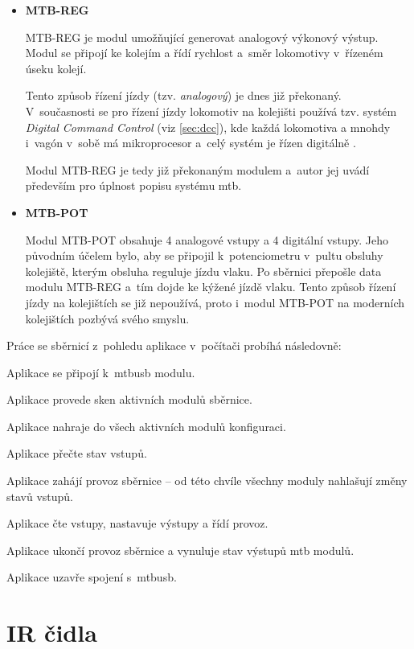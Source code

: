 \begin{itemize}
\item \textbf{MTB-REG}

	MTB-REG je modul umožňující generovat analogový výkonový výstup. Modul se
	připojí ke kolejím a řídí rychlost a~směr lokomotivy v~řízeném úseku kolejí.

	Tento způsob řízení jízdy (tzv. \textit{analogový}) je dnes již překonaný.
	V~současnosti se pro řízení jízdy lokomotiv na kolejišti používá tzv. systém
	\textit{Digital Command Control} (viz \ref{sec:dcc}), kde každá lokomotiva
	a mnohdy i~vagón v~sobě má mikroprocesor a~celý systém je řízen
	digitálně \cite{dcc_intro:web}.

	Modul MTB-REG je tedy již překonaným modulem a~autor jej uvádí především pro
	úplnost popisu systému \gls{mtb}.

\item \textbf{MTB-POT}

	Modul MTB-POT obsahuje 4 analogové vstupy a 4 digitální vstupy. Jeho
	původním účelem bylo, aby se připojil k~potenciometru v~pultu obsluhy
	kolejiště, kterým obsluha reguluje jízdu vlaku. Po sběrnici přepošle data
	modulu MTB-REG a~tím dojde ke kýžené jízdě vlaku. Tento způsob řízení jízdy
	na kolejištích se již nepoužívá, proto i~modul MTB-POT na moderních
	kolejištích pozbývá svého smyslu.

\end{itemize}

Práce se sběrnicí z~pohledu aplikace v~počítači probíhá následovně:

\begin{compactenum}
\item Aplikace se připojí k~\gls{mtbusb} modulu.
\item Aplikace provede sken aktivních modulů sběrnice.
\item Aplikace nahraje do všech aktivních modulů konfiguraci.
\item Aplikace přečte stav vstupů.
\item Aplikace zahájí provoz sběrnice – od této chvíle všechny moduly nahlašují
	změny stavů vstupů.
\item Aplikace čte vstupy, nastavuje výstupy a řídí provoz.
\item Aplikace ukončí provoz sběrnice a vynuluje stav výstupů \gls{mtb} modulů.
\item Aplikace uzavře spojení s~\gls{mtbusb}.
\end{compactenum}


\section{IR čidla} \label{sec:ir}

